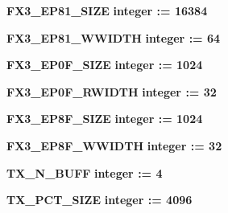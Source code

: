 \begin{DoxyCompactItemize}
\item 
{\bf F\+X3\+\_\+\+E\+P81\+\_\+\+S\+I\+ZE} {\bfseries {\bfseries \textcolor{comment}{integer}\textcolor{vhdlchar}{ }\textcolor{vhdlchar}{ }\textcolor{vhdlchar}{\+:}\textcolor{vhdlchar}{=}\textcolor{vhdlchar}{ }\textcolor{vhdlchar}{ } \textcolor{vhdldigit}{16384} \textcolor{vhdlchar}{ }}}
\item 
{\bf F\+X3\+\_\+\+E\+P81\+\_\+\+W\+W\+I\+D\+TH} {\bfseries {\bfseries \textcolor{comment}{integer}\textcolor{vhdlchar}{ }\textcolor{vhdlchar}{ }\textcolor{vhdlchar}{\+:}\textcolor{vhdlchar}{=}\textcolor{vhdlchar}{ }\textcolor{vhdlchar}{ } \textcolor{vhdldigit}{64} \textcolor{vhdlchar}{ }}}
\item 
{\bf F\+X3\+\_\+\+E\+P0\+F\+\_\+\+S\+I\+ZE} {\bfseries {\bfseries \textcolor{comment}{integer}\textcolor{vhdlchar}{ }\textcolor{vhdlchar}{ }\textcolor{vhdlchar}{\+:}\textcolor{vhdlchar}{=}\textcolor{vhdlchar}{ }\textcolor{vhdlchar}{ } \textcolor{vhdldigit}{1024} \textcolor{vhdlchar}{ }}}
\item 
{\bf F\+X3\+\_\+\+E\+P0\+F\+\_\+\+R\+W\+I\+D\+TH} {\bfseries {\bfseries \textcolor{comment}{integer}\textcolor{vhdlchar}{ }\textcolor{vhdlchar}{ }\textcolor{vhdlchar}{\+:}\textcolor{vhdlchar}{=}\textcolor{vhdlchar}{ }\textcolor{vhdlchar}{ } \textcolor{vhdldigit}{32} \textcolor{vhdlchar}{ }}}
\item 
{\bf F\+X3\+\_\+\+E\+P8\+F\+\_\+\+S\+I\+ZE} {\bfseries {\bfseries \textcolor{comment}{integer}\textcolor{vhdlchar}{ }\textcolor{vhdlchar}{ }\textcolor{vhdlchar}{\+:}\textcolor{vhdlchar}{=}\textcolor{vhdlchar}{ }\textcolor{vhdlchar}{ } \textcolor{vhdldigit}{1024} \textcolor{vhdlchar}{ }}}
\item 
{\bf F\+X3\+\_\+\+E\+P8\+F\+\_\+\+W\+W\+I\+D\+TH} {\bfseries {\bfseries \textcolor{comment}{integer}\textcolor{vhdlchar}{ }\textcolor{vhdlchar}{ }\textcolor{vhdlchar}{\+:}\textcolor{vhdlchar}{=}\textcolor{vhdlchar}{ }\textcolor{vhdlchar}{ } \textcolor{vhdldigit}{32} \textcolor{vhdlchar}{ }}}
\item 
{\bf T\+X\+\_\+\+N\+\_\+\+B\+U\+FF} {\bfseries {\bfseries \textcolor{comment}{integer}\textcolor{vhdlchar}{ }\textcolor{vhdlchar}{ }\textcolor{vhdlchar}{\+:}\textcolor{vhdlchar}{=}\textcolor{vhdlchar}{ }\textcolor{vhdlchar}{ } \textcolor{vhdldigit}{4} \textcolor{vhdlchar}{ }}}
\item 
{\bf T\+X\+\_\+\+P\+C\+T\+\_\+\+S\+I\+ZE} {\bfseries {\bfseries \textcolor{comment}{integer}\textcolor{vhdlchar}{ }\textcolor{vhdlchar}{ }\textcolor{vhdlchar}{\+:}\textcolor{vhdlchar}{=}\textcolor{vhdlchar}{ }\textcolor{vhdlchar}{ } \textcolor{vhdldigit}{4096} \textcolor{vhdlchar}{ }}}

\end{DoxyCompactItemize}

